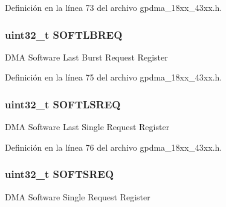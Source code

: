 Definición en la línea 73 del archivo gpdma\+\_\+18xx\+\_\+43xx.\+h.

\subsubsection[{\texorpdfstring{S\+O\+F\+T\+L\+B\+R\+EQ}{SOFTLBREQ}}]{ uint32\+\_\+t S\+O\+F\+T\+L\+B\+R\+EQ}\hypertarget{struct_l_p_c___g_p_d_m_a___t_a10c29fa25f70c95969d96713c329d4fe}{}\label{struct_l_p_c___g_p_d_m_a___t_a10c29fa25f70c95969d96713c329d4fe}
D\+MA Software Last Burst Request Register 

Definición en la línea 75 del archivo gpdma\+\_\+18xx\+\_\+43xx.\+h.

\subsubsection[{\texorpdfstring{S\+O\+F\+T\+L\+S\+R\+EQ}{SOFTLSREQ}}]{ uint32\+\_\+t S\+O\+F\+T\+L\+S\+R\+EQ}\hypertarget{struct_l_p_c___g_p_d_m_a___t_a4f5c850ea4cff593740ef262f7ec6c5a}{}\label{struct_l_p_c___g_p_d_m_a___t_a4f5c850ea4cff593740ef262f7ec6c5a}
D\+MA Software Last Single Request Register 

Definición en la línea 76 del archivo gpdma\+\_\+18xx\+\_\+43xx.\+h.

\subsubsection[{\texorpdfstring{S\+O\+F\+T\+S\+R\+EQ}{SOFTSREQ}}]{ uint32\+\_\+t S\+O\+F\+T\+S\+R\+EQ}\hypertarget{struct_l_p_c___g_p_d_m_a___t_a34997f304424883a86b354f19fe3708a}{}\label{struct_l_p_c___g_p_d_m_a___t_a34997f304424883a86b354f19fe3708a}
D\+MA Software Single Request Register 

